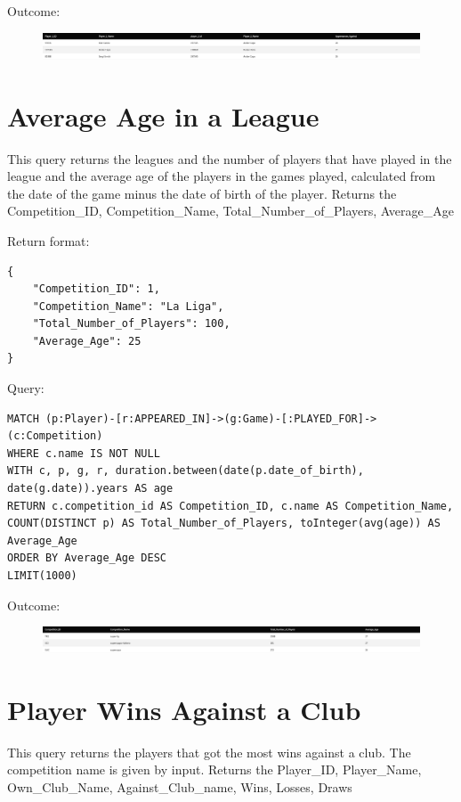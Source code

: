 \documentclass{Configuration_Files/PoliMi3i_thesis}
\begin{document}
Outcome:

\begin{figure}[H]
    \centering
    \includegraphics[width=\linewidth]{Project Template/Images/query_output/q3.png}
\end{figure}



\section{Average Age in a League}
This query returns the leagues and the number of players that have played in the league and the average age of the players in the games played, calculated from the date of the game minus the date of birth of the player. Returns the Competition\_ID, Competition\_Name, Total\_Number\_of\_Players, Average\_Age

Return format:
\begin{lstlisting}[style=json]
{
    "Competition_ID": 1,
    "Competition_Name": "La Liga",
    "Total_Number_of_Players": 100,
    "Average_Age": 25
}
\end{lstlisting}


Query:

\begin{lstlisting}[language=Cypher]
MATCH (p:Player)-[r:APPEARED_IN]->(g:Game)-[:PLAYED_FOR]->(c:Competition)
WHERE c.name IS NOT NULL
WITH c, p, g, r, duration.between(date(p.date_of_birth), date(g.date)).years AS age
RETURN c.competition_id AS Competition_ID, c.name AS Competition_Name, COUNT(DISTINCT p) AS Total_Number_of_Players, toInteger(avg(age)) AS Average_Age
ORDER BY Average_Age DESC
LIMIT(1000)
\end{lstlisting}


Outcome:
\begin{figure}[H]
    \centering
    \includegraphics[width=\linewidth]{Project Template/Images/query_output/q4.png}
\end{figure}











\section{Player Wins Against a Club}
This query returns the players that got the most wins against a club. The competition name is given by input.
Returns the Player\_ID, Player\_Name, Own\_Club\_Name, Against\_Club\_name, Wins, Losses, Draws
\end{document}
